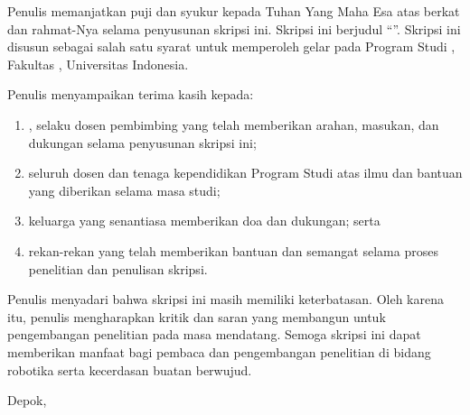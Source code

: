 \vspace*{4\baselineskip}

Penulis memanjatkan puji dan syukur kepada Tuhan Yang Maha Esa atas berkat dan rahmat-Nya selama penyusunan skripsi ini. Skripsi ini berjudul ``\judul''. Skripsi ini disusun sebagai salah satu syarat untuk memperoleh gelar \gelar{} pada Program Studi \program, Fakultas \fakultas, Universitas Indonesia.

Penulis menyampaikan terima kasih kepada:
\begin{enumerate}
    \item \pembimbing, selaku dosen pembimbing yang telah memberikan arahan, masukan, dan dukungan selama penyusunan skripsi ini;
    \item seluruh dosen dan tenaga kependidikan Program Studi \program{} atas ilmu dan bantuan yang diberikan selama masa studi;
    \item keluarga yang senantiasa memberikan doa dan dukungan; serta
    \item rekan-rekan yang telah memberikan bantuan dan semangat selama proses penelitian dan penulisan skripsi.
\end{enumerate}

Penulis menyadari bahwa skripsi ini masih memiliki keterbatasan. Oleh karena itu, penulis mengharapkan kritik dan saran yang membangun untuk pengembangan penelitian pada masa mendatang. Semoga skripsi ini dapat memberikan manfaat bagi pembaca dan pengembangan penelitian di bidang robotika serta kecerdasan buatan berwujud.

\vspace*{0.1cm}
\begin{flushright}
Depok, \tanggalPengesahan\\[0.1cm]
\vspace*{2cm}
\penulis
\end{flushright}
